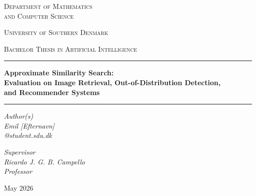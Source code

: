 \documentclass[12pt, a4paper]{report}
\begin{document}
\begin{titlepage}
\centering
\vspace*{1cm}

{\scshape\Large Department of Mathematics\\and Computer Science\par}
\vspace{0.5cm}
{\scshape\large University of Southern Denmark\par}
{\scshape\large Bachelor Thesis in Artificial Intelligence\par}

\vspace{1.5cm}
\noindent\rule{\textwidth}{0.4pt}
{\huge\bfseries Approximate Similarity Search:\\[0.3em]
\large Evaluation on Image Retrieval, Out-of-Distribution Detection,\\
and Recommender Systems\par}
\noindent\rule{\textwidth}{0.4pt}

\vspace{2cm}

\begin{center}
\itshape Author(s)\\
\upshape Emil [Efternavn]\\
[email]@student.sdu.dk
\end{center}

\vspace{1cm}

\begin{center}
\itshape Supervisor\\
\upshape Ricardo J. G. B. Campello\\
Professor
\end{center}

\vfill
{\large May 2026\par}

\vspace{1cm}

\end{titlepage}

\begin{abstract}
\paragraph{English}
Your abstract in English.

\paragraph{Danish}
Your abstract in Danish.
\end{abstract}
\newpage
\end{document}
